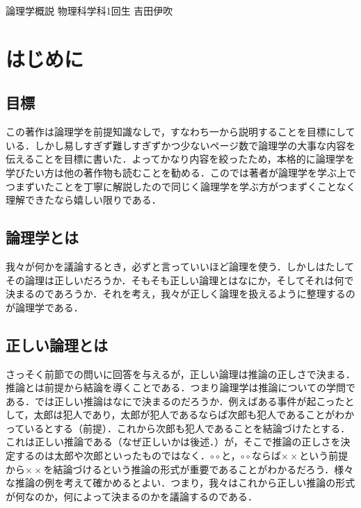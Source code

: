 \documentclass[10pt,b5paper,papersize,dvipdfmx]{jsbook}
\begin{document}

\kaishititle%
  {論理学概説}%
  {物理科学科1回生}%
  {吉田伊吹}%

\section{はじめに}
\subsection{目標}
この著作は論理学を前提知識なしで，すなわち一から説明することを目標にしている．しかし易しすぎず難しすぎずかつ少ないページ数で論理学の大事な内容を伝えることを目標に書いた．よってかなり内容を絞ったため，本格的に論理学を学びたい方は他の著作物も読むことを勧める．このでは著者が論理学を学ぶ上でつまずいたことを丁寧に解説したので同じく論理学を学ぶ方がつまずくことなく理解できたなら嬉しい限りである．

\subsection{論理学とは}
我々が何かを議論するとき，必ずと言っていいほど論理を使う．しかしはたしてその論理は正しいだろうか．そもそも正しい論理とはなにか，そしてそれは何で決まるのであろうか．それを考え，我々が正しく論理を扱えるように整理するのが論理学である．
\subsection{正しい論理とは}
さっそく前節での問いに回答を与えるが，正しい論理は推論の正しさで決まる．推論とは前提から結論を導くことである．つまり論理学は推論についての学問である．では正しい推論はなにで決まるのだろうか．例えばある事件が起こったとして，太郎は犯人であり，太郎が犯人であるならば次郎も犯人であることがわかっているとする（前提）．これから次郎も犯人であることを結論づけたとする．これは正しい推論である（なぜ正しいかは後述．）が，そこで推論の正しさを決定するのは太郎や次郎といったものではなく．$\circ \circ$と，$\circ \circ$ならば$\times \times$という前提から$\times \times$を結論づけるという推論の形式が重要であることがわかるだろう．様々な推論の例を考えて確かめるとよい．つまり，我々はこれから正しい推論の形式が何なのか，何によって決まるのかを議論するのである．
\end{document}
